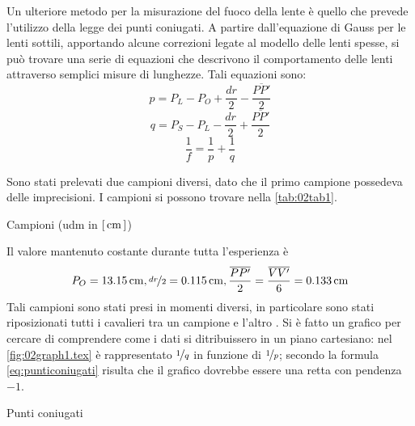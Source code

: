 Un ulteriore metodo per la misurazione del fuoco della lente è quello che prevede l'utilizzo della legge dei punti coniugati.
 A partire dall'equazione di Gauss per le lenti sottili, apportando alcune correzioni legate al modello delle lenti
 spesse, si può trovare una serie di equazioni che descrivono il comportamento delle lenti attraverso semplici misure di
 lunghezze. Tali equazioni sono:
\[p=P_L - P_O + \frac {dr} {2} - \frac {\overline{PP'}}{2}\]
\[q=P_S - P_L -\frac {dr} {2} + \frac {\overline{PP'}} {2}\]
\begin{equation} \label{eq:punticoniugati}
\frac{1}{f} = \frac {1}{p} + \frac {1}{q}
\end{equation}

 Sono stati prelevati due campioni diversi, dato che il primo campione possedeva delle imprecisioni. I campioni si possono trovare
 nella \autoref{tab:02tab1}.
\begin{tabella}
	\centering
	
	\caption{Campioni (udm in $[\,\mathrm{cm}\,]$)}
	\label{tab:02tab1}
\end{tabella}
%
Il valore mantenuto costante durante tutta l'esperienza \`e
\[P_O = 13.15 \,\mathrm{cm} ,\\ \nicefrac{dr}{2} = 0.115 \,\mathrm{cm} , \\ \frac {\overline{PP'}}{2} = \frac{\overline{VV'}}{6} = 0.133 \,\mathrm{cm}\] 
Tali campioni sono stati presi in momenti diversi, in particolare sono stati riposizionati tutti i cavalieri tra un campione e l'altro
. Si \`e fatto un grafico per cercare di comprendere come i dati si ditribuissero in un piano cartesiano: nel  \autoref{fig:02graph1.tex} è rappresentato $\nicefrac{1}{q}$ in funzione di $\nicefrac{1}{p}$; secondo la formula
 \eqref{eq:punticoniugati} risulta che il grafico dovrebbe essere una retta con
 pendenza $-1$.
\begin{grafico} \centering  \caption{Punti coniugati} \label{fig:02graph1.tex} \end{grafico}

